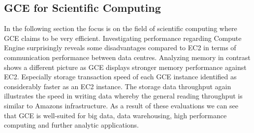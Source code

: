 \subsection{GCE for Scientific Computing}
In the following section the focus is on the field of scientific computing where GCE claims to be very efficient. Investigating performance regarding Compute Engine surprisingly reveals some disadvantages compared to EC2 in terms of communication performance between data centres. Analyzing memory in contrast shows a different picture as GCE displays stronger memory performance against EC2. Especially storage transaction speed of each GCE instance identified as considerably faster as an EC2 instance. The storage data throughput again illustrates the speed in writing data whereby the general reading throughput is similar to Amazons infrastructure. \cite{GCE_2013} As a result of these evaluations we can see that GCE is well-suited for big data, data warehousing, high performance computing and further analytic applications. \cite{IaaS_2015}